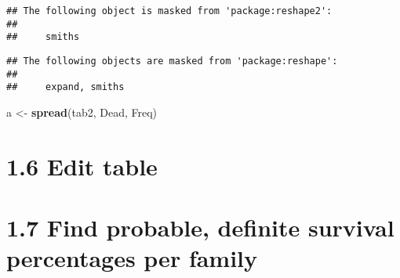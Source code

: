 \documentclass[]{article}
\newenvironment{Shaded}{\begin{snugshade}}{\end{snugshade}}
\newcommand{\KeywordTok}[1]{\textcolor[rgb]{0.13,0.29,0.53}{\textbf{#1}}}
\newcommand{\DecValTok}[1]{\textcolor[rgb]{0.00,0.00,0.81}{#1}}
\newcommand{\StringTok}[1]{\textcolor[rgb]{0.31,0.60,0.02}{#1}}
\newcommand{\CommentTok}[1]{\textcolor[rgb]{0.56,0.35,0.01}{\textit{#1}}}
\newcommand{\OtherTok}[1]{\textcolor[rgb]{0.56,0.35,0.01}{#1}}
\newcommand{\OperatorTok}[1]{\textcolor[rgb]{0.81,0.36,0.00}{\textbf{#1}}}
\newcommand{\NormalTok}[1]{#1}
\begin{document}
\begin{verbatim}
## The following object is masked from 'package:reshape2':
## 
##     smiths
\end{verbatim}

\begin{verbatim}
## The following objects are masked from 'package:reshape':
## 
##     expand, smiths
\end{verbatim}

\begin{Shaded}
\begin{Highlighting}[]
\NormalTok{a <-}\StringTok{ }\KeywordTok{spread}\NormalTok{(tab2, Dead, Freq)}
\end{Highlighting}
\end{Shaded}

\section{1.6 Edit table}\label{edit-table}

\begin{Shaded}
\end{Shaded}

\section{1.7 Find probable, definite survival percentages per
family}\label{find-probable-definite-survival-percentages-per-family}
\end{document}
